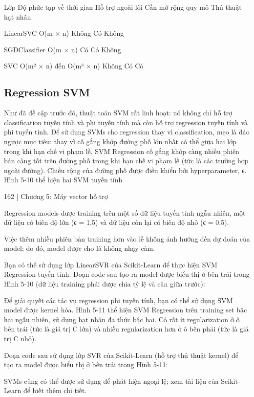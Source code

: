 Lớp Độ phức tạp về thời gian Hỗ trợ ngoài lõi Cần mở rộng quy mô Thủ thuật hạt nhân

LinearSVC O(m × n) Không Có Không

SGDClassifier O(m × n) Có Có Không

SVC O(m² × n) đến O(m³ × n) Không Có Có

\subsection{Regression SVM}

Như đã đề cập trước đó, thuật toán SVM rất linh hoạt: nó không chỉ hỗ trợ classification tuyến tính và phi tuyến tính mà còn hỗ trợ regression tuyến tính và phi tuyến tính. Để sử dụng SVMs cho regression thay vì classification, mẹo là đảo ngược mục tiêu: thay vì cố gắng khớp đường phố lớn nhất có thể giữa hai lớp trong khi hạn chế vi phạm lề, SVM Regression cố gắng khớp càng nhiều phiên bản càng tốt trên đường phố trong khi hạn chế vi phạm lề (tức là các trường hợp ngoài đường). Chiều rộng của đường phố được điều khiển bởi hyperparameter, ϵ. Hình 5-10 thể hiện hai SVM tuyến tính

162 | Chương 5: Máy vector hỗ trợ

Regression models được training trên một số dữ liệu tuyến tính ngẫu nhiên, một dữ liệu có biên độ lớn (ϵ = 1,5) và dữ liệu còn lại có biên độ nhỏ (ϵ = 0,5).

Việc thêm nhiều phiên bản training hơn vào lề không ảnh hưởng đến dự đoán của model; do đó, model được cho là không nhạy cảm.

Bạn có thể sử dụng lớp LinearSVR của Scikit-Learn để thực hiện SVM Regression tuyến tính. Đoạn code sau tạo ra model được biểu thị ở bên trái trong Hình 5-10 (dữ liệu training phải được chia tỷ lệ và căn giữa trước):

Để giải quyết các tác vụ regression phi tuyến tính, bạn có thể sử dụng SVM model được kernel hóa. Hình 5-11 thể hiện SVM Regression trên training set bậc hai ngẫu nhiên, sử dụng hạt nhân đa thức bậc hai. Có rất ít regularization ở ô bên trái (tức là giá trị C lớn) và nhiều regularization hơn ở ô bên phải (tức là giá trị C nhỏ).

Đoạn code sau sử dụng lớp SVR của Scikit-Learn (hỗ trợ thủ thuật kernel) để tạo ra model được biểu thị ở bên trái trong Hình 5-11:

SVMs cũng có thể được sử dụng để phát hiện ngoại lệ; xem tài liệu của Scikit-Learn để biết thêm chi tiết.


